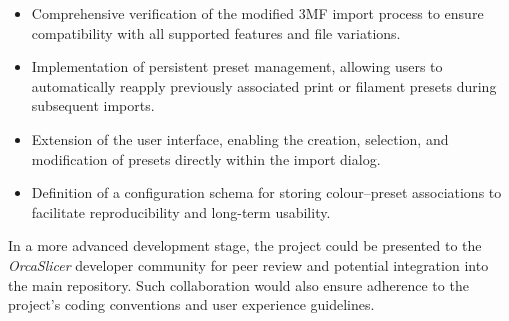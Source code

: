 \begin{itemize}
    \item Comprehensive verification of the modified 3MF import process to ensure compatibility with all supported features and file variations.
    \item Implementation of persistent preset management, allowing users to automatically reapply previously associated print or filament presets during subsequent imports.
    \item Extension of the user interface, enabling the creation, selection, and modification of presets directly within the import dialog.
    \item Definition of a configuration schema for storing colour–preset associations to facilitate reproducibility and long-term usability.
\end{itemize}

In a more advanced development stage, the project could be presented to the \textit{OrcaSlicer} developer community for peer review and potential integration into the main repository. Such collaboration would also ensure adherence to the project’s coding conventions and user experience guidelines.

